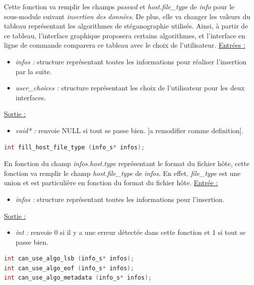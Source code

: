 \documentclass[11pt]{article}
\begin{document}
Cette fonction va remplir les champs \textit{passwd} et \textit{host.file\_type} 
de \textit{info} pour le sous-module suivant \textit{insertion des données}. 
De plus, elle va changer les valeurs du tableau représentant les algorithmes 
de stéganographie utilisés. Ainsi, à partir de ce tableau, l'interface graphique 
proposera certains algorithmes, et l'interface en ligne de commande comparera 
ce tableau avec le choix de l'utilisateur. 
\newline
\underline{Entrées :} 
\begin{itemize}
\item \textit{infos :} structure représentant toutes les informations pour 
réaliser l'insertion par la suite. 
\item \textit{user\_choices :} structure représentant les choix de 
l'utilisateur pour les deux interfaces. 
\end{itemize}
\underline{Sortie :} 
\begin{itemize}
\item \textit{void* :} renvoie NULL si tout se passe bien. [a remodifier 
comme definition]. 
\newline 
\end{itemize}

\begin{lstlisting}[language=c]
int fill_host_file_type (info_s* infos);
\end{lstlisting}

En fonction du champ \textit{infos.host.type} représentant le format du 
fichier hôte, cette fonction va remplir le champ \textit{host.file\_type} 
de \textit{infos}. En effet, \textit{file\_type} est une union et est 
particulière en fonction du format du fichier hôte. 
\newline
\underline{Entrée :} 
\begin{itemize}
\item \textit{infos :} structure représentant toutes les informations pour 
l'insertion. 
\end{itemize}
\underline{Sortie :} 
\begin{itemize}
\item \textit{int :} renvoie 0 si il y a une erreur détectée dans cette 
fonction et 1 si tout se passe bien. 
\newline 
\end{itemize}

\begin{lstlisting}[language=c]
int can_use_algo_lsb (info_s* infos);
int can_use_algo_eof (info_s* infos);
int can_use_algo_metadata (info_s* infos);
\end{lstlisting}
\end{document}
